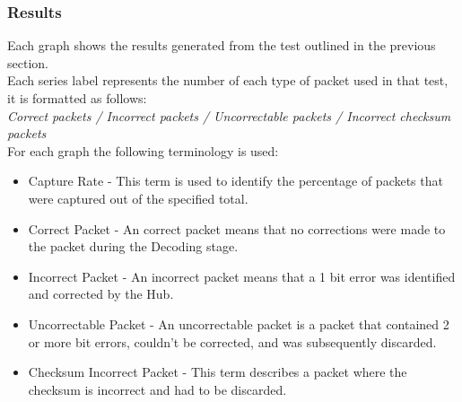 \documentclass[draft,preprint,12pt,3p]{elsarticle}
\begin{document}
\subsubsection{Results}
Each graph shows the results generated from the test outlined in the previous section.\\
Each series label represents the number of each type of packet used in that test, it is formatted as follows:\\[5pt]
\textit{Correct packets / Incorrect packets / Uncorrectable packets / Incorrect checksum packets}\\[5pt]
For each graph the following terminology is used:
\begin{itemize}
\item Capture Rate - This term is used to identify the percentage of packets that were captured out of the specified total.
\item Correct Packet - An correct packet means that no corrections were made to the packet during the Decoding stage.
\item Incorrect Packet - An incorrect packet means that a 1 bit error was identified and corrected by the Hub.
\item Uncorrectable Packet - An uncorrectable packet is a packet that contained 2 or more bit errors, couldn't be corrected, and was subsequently discarded.
\item Checksum Incorrect Packet - This term describes a packet where the checksum is incorrect and had to be discarded.

\end{itemize}
\end{document}

